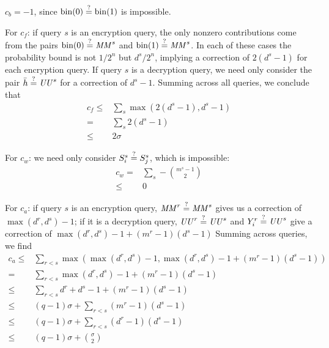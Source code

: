 \documentclass[hctr2.tex]{subfiles}
\begin{document}
\(c_b = -1\), since 
\(\operatorname{bin}(0) \stackrel{\text{?}}{=} \operatorname{bin}(1)\) is impossible.

For \(c_f\): if query \(s\) is an encryption query,
the only nonzero contributions come from the pairs
\(\operatorname{bin}(0) \stackrel{\text{?}}{=} \mathit{MM}^s\) and
\(\operatorname{bin}(1) \stackrel{\text{?}}{=} \mathit{MM}^s\). In each of these
cases the probability bound is not \(1/2^n\) but
\(d^s/2^n\), implying a correction of
\(2(d^s - 1)\) for each encryption query.
If query \(s\) is a decryption query,
we need only consider the pair \(\bar{h} \stackrel{\text{?}}{=} \mathit{UU}^s\)
for a correction of \(d^s - 1\). 
Summing across all queries, we conclude that
\begin{align*}
    c_f \leq &\sum_s \max(2(d^s - 1), d^s - 1) \\
        = &\sum_s 2(d^s - 1) \\
        \leq & 2\sigma
\end{align*}

For \(c_w\): we need only consider \(S_i^s \stackrel{\text{?}}{=} S_j^s\),
which is impossible:
\begin{align*}
    c_w = &\sum_s -\binom{m^s -1}{2} \\
        \leq &0
\end{align*}

For \(c_a\): if query \(s\) is an encryption query,
\(\mathit{MM}^r \stackrel{\text{?}}{=} \mathit{MM}^s\) gives us a correction of
\(\max(d^r, d^s) -1\);
if it is a decryption query,
\(\mathit{UU}^r \stackrel{\text{?}}{=} \mathit{UU}^s\) and \(Y_i^r \stackrel{\text{?}}{=} \mathit{UU}^s\)
give a correction of
\(\max(d^r, d^s) -1 + (m^r -1 )(d^s -1)\)
Summing across queries, we find
\begin{align*}
    c_a \leq &\sum_{r<s} \max(\max(d^r, d^s) -1, \max(d^r, d^s) -1 + (m^r -1 )(d^s -1)) \\
           = &\sum_{r<s} \max(d^r, d^s) -1 + (m^r -1 )(d^s -1) \\
        \leq & \sum_{r < s} d^r + d^s -1 + (m^r -1 )(d^s -1)\\
        \leq & (q-1)\sigma + \sum_{r < s} (m^r -1 )(d^s -1) \\
        \leq & (q-1)\sigma + \sum_{r < s} (d^r -1)(d^s -1) \\
        \leq & (q-1)\sigma + \binom{\sigma}{2}
\end{align*}
\end{document}
